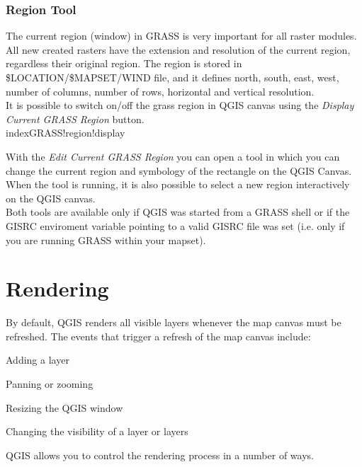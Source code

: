 \documentclass[10pt,english]{article}
\begin{document}
\begin{onehalfspace}
\subsubsection{Region Tool}

The current region (window) in GRASS is very important for all 
raster modules. All new created rasters have the extension and resolution
of the current region, regardless their original region. 
The region is stored in \$LOCATION/\$MAPSET/WIND file, and it defines
north, south, east, west, number of columns, number of rows, 
horizontal and vertical resolution.\\

It is possible to switch on/off the grass region in QGIS canvas
using the \textsl{Display Current GRASS Region}
button.\\index{GRASS!region!display}\

With the \textsl{Edit Current GRASS Region} you can open a tool 
in which you can change the current region and symbology
of the rectangle on the QGIS Canvas. When the tool is running,
it is also possible to select a new region interactively
on the QGIS canvas.\\

Both tools are available only if QGIS was started from a GRASS 
shell or if the GISRC enviroment variable pointing to a
valid GISRC file was set (i.e. only if you are running 
GRASS within your mapset).

\section{Rendering}\label{sec:redraw_events}
By default, QGIS renders all visible layers whenever the map canvas must be refreshed. The events that trigger a refresh of the map canvas include:
\begin{compactitem}
\item Adding a layer
\item Panning or zooming
\item Resizing the QGIS window
\item Changing the visibility of a layer or layers
\end{compactitem}
QGIS allows you to control the rendering process in a number of ways.

\end{onehalfspace}
\end{document}
